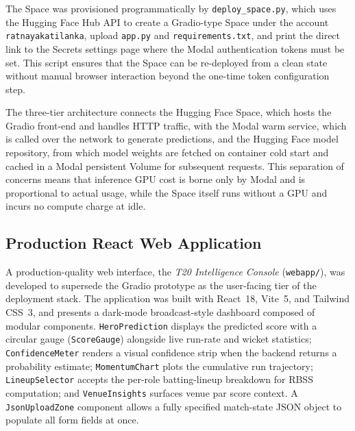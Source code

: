 The Space was provisioned programmatically by \texttt{deploy\_space.py}, which uses the Hugging Face Hub API to create a Gradio-type Space under the account \texttt{ratnayakatilanka}, upload \texttt{app.py} and \texttt{requirements.txt}, and print the direct link to the Secrets settings page where the Modal authentication tokens must be set. This script ensures that the Space can be re-deployed from a clean state without manual browser interaction beyond the one-time token configuration step.

The three-tier architecture connects the Hugging Face Space, which hosts the Gradio front-end and handles HTTP traffic, with the Modal warm service, which is called over the network to generate predictions, and the Hugging Face model repository, from which model weights are fetched on container cold start and cached in a Modal persistent Volume for subsequent requests. This separation of concerns means that inference GPU cost is borne only by Modal and is proportional to actual usage, while the Space itself runs without a GPU and incurs no compute charge at idle.

\subsection{Production React Web Application}

A production-quality web interface, the \textit{T20 Intelligence Console} (\texttt{webapp/}), was developed to supersede the Gradio prototype as the user-facing tier of the deployment stack. The application was built with React~18, Vite~5, and Tailwind CSS~3, and presents a dark-mode broadcast-style dashboard composed of modular components. \texttt{HeroPrediction} displays the predicted score with a circular gauge (\texttt{ScoreGauge}) alongside live run-rate and wicket statistics; \texttt{ConfidenceMeter} renders a visual confidence strip when the backend returns a probability estimate; \texttt{MomentumChart} plots the cumulative run trajectory; \texttt{LineupSelector} accepts the per-role batting-lineup breakdown for RBSS computation; and \texttt{VenueInsights} surfaces venue par score context. A \texttt{JsonUploadZone} component allows a fully specified match-state JSON object to populate all form fields at once.

